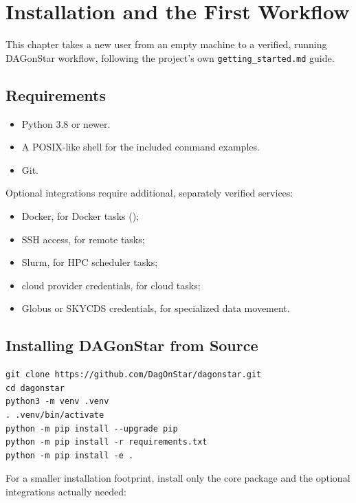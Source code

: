 \chapter{Installation and the First Workflow}
\label{ch:getting-started}

This chapter takes a new user from an empty machine to a verified, running
DAGonStar workflow, following the project's own \texttt{getting\_started.md}
guide.

\section{Requirements}

\begin{itemize}[leftmargin=1.4em]
  \item Python 3.8 or newer.
  \item A POSIX-like shell for the included command examples.
  \item Git.
\end{itemize}

Optional integrations require additional, separately verified services:

\begin{itemize}[leftmargin=1.4em]
  \item Docker, for Docker tasks ();
  \item SSH access, for remote tasks;
  \item Slurm, for HPC scheduler tasks;
  \item cloud provider credentials, for cloud tasks;
  \item Globus or SKYCDS credentials, for specialized data movement.
\end{itemize}

\section{Installing DAGonStar from Source}

\begin{lstlisting}[style=bash, caption={Full development installation.}]
git clone https://github.com/DagOnStar/dagonstar.git
cd dagonstar
python3 -m venv .venv
. .venv/bin/activate
python -m pip install --upgrade pip
python -m pip install -r requirements.txt
python -m pip install -e .
\end{lstlisting}

For a smaller installation footprint, install only the core package and the
optional integrations actually needed:

